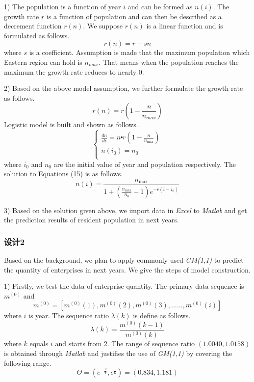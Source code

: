 \documentclass{apmcmthesis}
\begin{document}
1) The population is a function of year $i$ and can be formed as $n(i)$. The growth rate $r$ is a function of population and can then be described as a decrement function $r(n)$. We suppose $r(n)$ is a linear function and is formulated as follows.
\begin{equation}
r(n)=r-sn
\end{equation}
where $s$ is a coefficient. Assumption is made that the maximum population which Eastern region can hold is $n_{max}$. That means when the population reaches the maximum the growth rate reduces to nearly 0.

2) Based on the above model assumption, we further formulate the growth rate as follows.
\begin{equation}
r(n)=r(1-{\frac{n}{n_{max}}})
\end{equation}
Logistic model is built and shown as follows.
\begin{equation}
\left\{ \begin{array}{*{35}{l}}
   \frac{dn}{di}=n\centerdot r(1-\frac{n}{{{n}_{\max }}})  \\
   n({{i}_{0}})={{n}_{0}}  \\
\end{array} \right. 
\end{equation}
where $i_0$ and $n_0$ are the initial value of year and population respectively. The solution to Equations (15) is as follows.
\begin{equation}
n(i)=\frac{{{n}_{\max }}}{1+(\frac{{{n}_{\max }}}{{{n}_{0}}}-1){{e}^{-r(i-{{i}_{0}})}}}
\end{equation}

3) Based on the solution given above, we import data in \textit{Excel} to \textit{Matlab} and get the prediction results of resident population in next years.
\subsubsection{设计2}
\hspace{2em}Based on the background, we plan to apply commonly used \textit{GM(1,1)} to predict the quantity of enterprises in next years. We give the steps of model construction.

1) Firstly, we test the data of enterprise quantity. The primary data sequence is $m^{(0)}$ and
\begin{equation}
m^{(0)}=[m^{(0)}(1), m^{(0)}(2), m^{(0)}(3),......, m^{(0)}(i)]
\end{equation}
where $i$ is year. The sequence ratio $\lambda(k)$ is define as follows.
\begin{equation}
\lambda (k)=\frac{{{m}^{(0)}}(k-1)}{{{m}^{(0)}}(k)}
\end{equation}
where $k$ equals $i$ and starts from 2. The range of sequence ratio $(1.0040, 1.0158)$ is obtained through \textit{Matlab} and justifies the use of \textit{GM(1,1)} by covering the following range.
\begin{equation}
\Theta=(e^{-\frac{2}{\pi}}, e^{\frac{1}{6}})=(0.834, 1.181)
\end{equation} 
\end{document}
